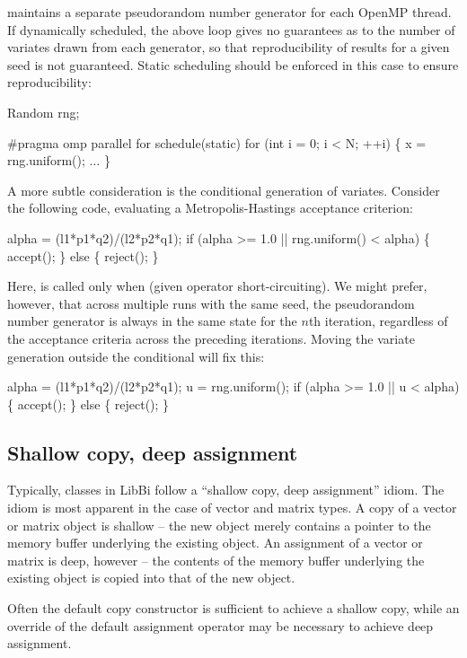  maintains a separate pseudorandom number
generator for each OpenMP thread. If
dynamically scheduled, the above loop gives no guarantees as to the number of
variates drawn from each generator, so that reproducibility of results for a
given seed is not guaranteed. Static scheduling should be enforced in this
case to ensure reproducibility:
\begin{cppcode}
Random rng;

#pragma omp parallel for schedule(static)
for (int i = 0; i < N; ++i) \{
  x = rng.uniform();
  \(\ldots\)
\}
\end{cppcode}

A more subtle consideration is the conditional generation of
variates. Consider the following code, evaluating a
Metropolis-Hastings acceptance criterion:
\begin{cppcode}
alpha = (l1*p1*q2)/(l2*p2*q1);
if (alpha >= 1.0 || rng.uniform() < alpha) \{
  accept();
\} else \{
  reject();
\}
\end{cppcode}
Here,  is called only when  (given
operator short-circuiting). We might prefer, however, that across multiple
runs with the same seed, the pseudorandom number generator is always in the
same state for the $n$th iteration, regardless of the acceptance criteria
across the preceding iterations. Moving the variate generation outside the
conditional will fix this:
\begin{cppcode}
alpha = (l1*p1*q2)/(l2*p2*q1);
u = rng.uniform();
if (alpha >= 1.0 || u < alpha) \{
  accept();
\} else \{
  reject();
\}
\end{cppcode}

\subsection{Shallow copy, deep assignment}

Typically, classes in LibBi follow a ``shallow copy, deep assignment''
idiom. The idiom is most apparent in the case of vector and matrix types. A
copy of a vector or matrix object is shallow -- the new object merely contains
a pointer to the memory buffer underlying the existing object. An assignment
of a vector or matrix is deep, however -- the contents of the memory buffer
underlying the existing object is copied into that of the new object.

Often the default copy constructor is sufficient to achieve a shallow copy,
while an override of the default assignment operator may be necessary to
achieve deep assignment.

